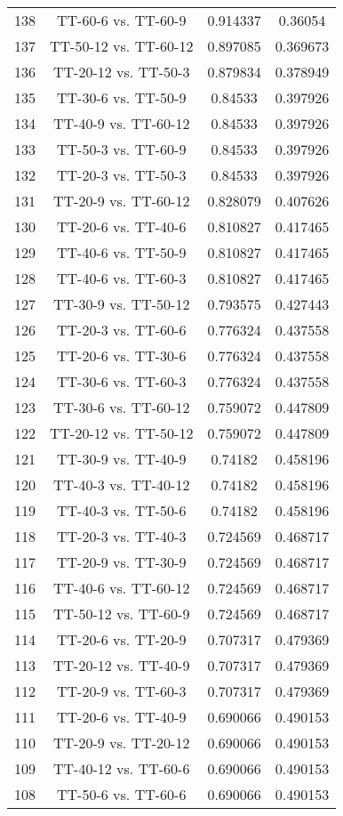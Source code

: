 \documentclass[a4paper,10pt]{article}
\begin{document}
\begin{landscape}
\begin{table}[!htp]
\begin{tabular}{cccc}
138&TT-60-6 vs. TT-60-9&0.914337&0.36054\\
137&TT-50-12 vs. TT-60-12&0.897085&0.369673\\
136&TT-20-12 vs. TT-50-3&0.879834&0.378949\\
135&TT-30-6 vs. TT-50-9&0.84533&0.397926\\
134&TT-40-9 vs. TT-60-12&0.84533&0.397926\\
133&TT-50-3 vs. TT-60-9&0.84533&0.397926\\
132&TT-20-3 vs. TT-50-3&0.84533&0.397926\\
131&TT-20-9 vs. TT-60-12&0.828079&0.407626\\
130&TT-20-6 vs. TT-40-6&0.810827&0.417465\\
129&TT-40-6 vs. TT-50-9&0.810827&0.417465\\
128&TT-40-6 vs. TT-60-3&0.810827&0.417465\\
127&TT-30-9 vs. TT-50-12&0.793575&0.427443\\
126&TT-20-3 vs. TT-60-6&0.776324&0.437558\\
125&TT-20-6 vs. TT-30-6&0.776324&0.437558\\
124&TT-30-6 vs. TT-60-3&0.776324&0.437558\\
123&TT-30-6 vs. TT-60-12&0.759072&0.447809\\
122&TT-20-12 vs. TT-50-12&0.759072&0.447809\\
121&TT-30-9 vs. TT-40-9&0.74182&0.458196\\
120&TT-40-3 vs. TT-40-12&0.74182&0.458196\\
119&TT-40-3 vs. TT-50-6&0.74182&0.458196\\
118&TT-20-3 vs. TT-40-3&0.724569&0.468717\\
117&TT-20-9 vs. TT-30-9&0.724569&0.468717\\
116&TT-40-6 vs. TT-60-12&0.724569&0.468717\\
115&TT-50-12 vs. TT-60-9&0.724569&0.468717\\
114&TT-20-6 vs. TT-20-9&0.707317&0.479369\\
113&TT-20-12 vs. TT-40-9&0.707317&0.479369\\
112&TT-20-9 vs. TT-60-3&0.707317&0.479369\\
111&TT-20-6 vs. TT-40-9&0.690066&0.490153\\
110&TT-20-9 vs. TT-20-12&0.690066&0.490153\\
109&TT-40-12 vs. TT-60-6&0.690066&0.490153\\
108&TT-50-6 vs. TT-60-6&0.690066&0.490153\\

\end{tabular}
\end{table}
\end{landscape}
\end{document}
